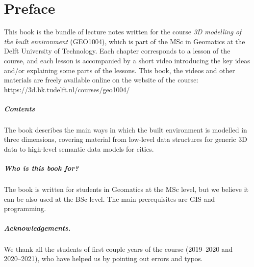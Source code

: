 


\chapter*{Preface}

This book is the bundle of lecture notes written for the course \emph{3D modelling of the built environment} (GEO1004), which is part of the MSc in Geomatics at the Delft University of Technology.
Each chapter corresponds to a lesson of the course, and each lesson is accompanied by a short video introducing the key ideas and/or explaining some parts of the lessons.
This book, the videos and other materials are freely available online on the website of the course: \url{https://3d.bk.tudelft.nl/courses/geo1004/}

\paragraph*{Contents}
The book describes the main ways in which the built environment is modelled in three dimensions, covering material from low-level data structures for generic 3D data to high-level semantic data models for cities.

\paragraph*{Who is this book for?}
The book is written for students in Geomatics at the MSc level, but we believe it can be also used at the BSc level.
The main prerequisites are GIS and programming.

\paragraph*{Acknowledgements.}
We thank all the students of first couple years of the course (2019--2020 and 2020--2021), who have helped us by pointing out errors and typos.






